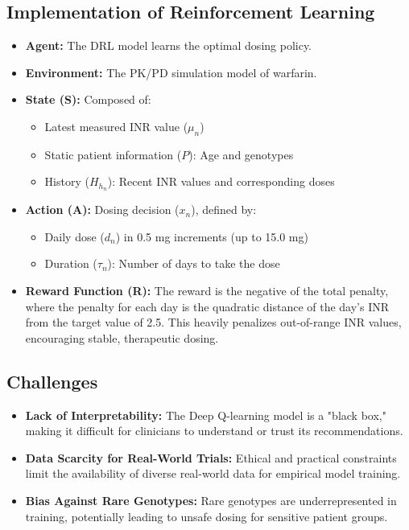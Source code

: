 \subsection*{Implementation of Reinforcement Learning}
\begin{itemize}
    \item \textbf{Agent:} The DRL model learns the optimal dosing policy.
    \item \textbf{Environment:} The PK/PD simulation model of warfarin.
    \item \textbf{State (S):} Composed of:
    \begin{itemize}
        \item Latest measured INR value ($\mu_n$)
        \item Static patient information ($P$): Age and genotypes
        \item History ($H_{h_n}$): Recent INR values and corresponding doses
    \end{itemize}
    \item \textbf{Action (A):} Dosing decision ($x_n$), defined by:
    \begin{itemize}
        \item Daily dose ($d_n$) in 0.5 mg increments (up to 15.0 mg)
        \item Duration ($\tau_n$): Number of days to take the dose
    \end{itemize}
    \item \textbf{Reward Function (R):} The reward is the negative of the total penalty, where the penalty for each day is the quadratic distance of the day's INR from the target value of 2.5. This heavily penalizes out-of-range INR values, encouraging stable, therapeutic dosing.
\end{itemize}

\subsection*{Challenges}
\begin{itemize}
    \item \textbf{Lack of Interpretability:} The Deep Q-learning model is a "black box," making it difficult for clinicians to understand or trust its recommendations.
    \item \textbf{Data Scarcity for Real-World Trials:} Ethical and practical constraints limit the availability of diverse real-world data for empirical model training.
    \item \textbf{Bias Against Rare Genotypes:} Rare genotypes are underrepresented in training, potentially leading to unsafe dosing for sensitive patient groups.
\end{itemize}

